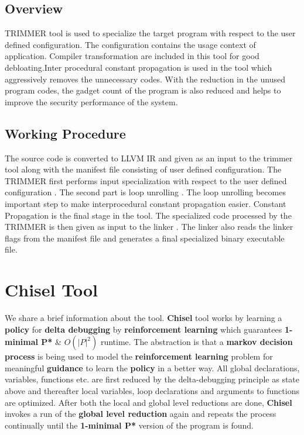 \documentclass{relatorio}
\begin{document}
\subsection{Overview}%
\label{Tools}

TRIMMER tool is used to specialize the target program with respect to the user defined configuration. The configuration contains the usage context of application. Compiler transformation are included in this tool for good debloating.Inter procedural  constant propagation is used in the tool which aggressively removes the unnecessary codes. With the reduction in the unused program codes, the gadget count of the program is also reduced and helps to improve the security performance of the system. 

\subsection{Working Procedure}%
\label{Tools}

The source code is converted to LLVM IR  and given as an input to the trimmer tool along with the manifest file consisting of user defined configuration. The TRIMMER first performs input specialization with respect to the user defined configuration . The second part is loop unrolling . The loop unrolling becomes important step to make interprocedural constant propagation easier. Constant Propagation is the final stage in the tool. The specialized code processed by the TRIMMER is then given as input to the linker . The linker also reads the linker flags from the manifest file and generates a final specialized binary executable file.

\section{Chisel Tool}%
\label{Tools}

We share a brief information about the tool. \textbf{Chisel} tool works by learning a \textbf{policy} for \textbf{delta debugging} by \textbf{reinforcement learning} which guarantees \textbf{1-minimal P*} \& $\textbf{$O(|P|^2)$}$ runtime. The abstraction is that a \textbf{markov decision process} is being used to model the \textbf{reinforcement learning} problem for meaningful \textbf{guidance} to learn the \textbf{policy} in a better way. All global declarations, variables, functions etc. are first reduced by the delta-debugging principle as state above and thereafter local variables, loop declarations and arguments to functions are optimized. After both the local and global level reductions are done, \textbf{Chisel} invokes a run of the \textbf{global level reduction} again and repeats the process continually until the \textbf{1-minimal P*} version of the program is found. 
\end{document}
